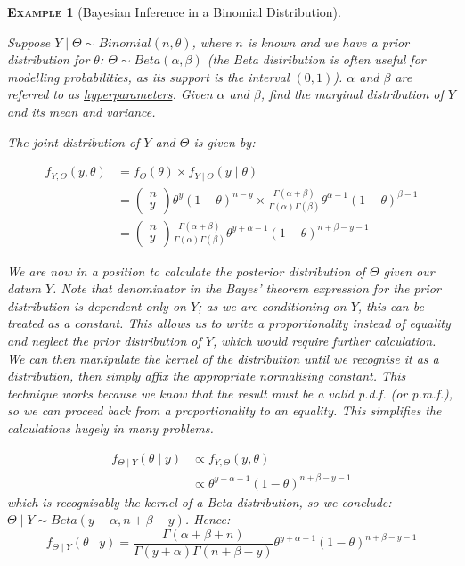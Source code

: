 \documentclass[12pt,a4paper]{article}
\newtheorem{example}{\textsc{Example}}[section]
\begin{document}
\begin{example}[Bayesian Inference in a Binomial Distribution]$\;$\par\vspace{1cm}

Suppose $Y\mid\Theta \sim Binomial(n,\theta)$, where $n$ is known and we have a prior distribution for $\theta$: $\Theta \sim Beta(\alpha,\beta)$ (the Beta distribution is often useful for modelling probabilities, as its support is the interval $(0,1)$). $\alpha$ and $\beta$ are referred to as \underline{hyperparameters}. Given $\alpha$ and $\beta$, find the marginal distribution of $Y$ and its mean and variance.

The joint distribution of $Y$ and $\Theta$ is given by:

\begin{align*}
f_{Y,\Theta}(y,\theta) &= f_\Theta(\theta) \times f_{Y\mid\Theta}(y\mid\theta)\\
&= \left(\begin{array}{c} \!\!n\!\! \\ \!\!y\!\!\end{array}\right)\theta^y (1-\theta)^{n-y} \times \frac{\Gamma(\alpha + \beta)}{\Gamma(\alpha)\Gamma(\beta)}\theta^{\alpha-1} (1-\theta)^{\beta -1}\\
&= \left(\begin{array}{c}\!\!n\!\! \\ \!\!y\!\!\end{array}\right) \frac{\Gamma(\alpha + \beta)}{\Gamma(\alpha)\Gamma(\beta)} \theta^{y+\alpha-1} (1-\theta)^{n+\beta - y -1}
\end{align*}

We are now in a position to calculate the posterior distribution of $\Theta$ given our datum $Y$. Note that denominator in the Bayes' theorem expression for the prior distribution is dependent only on $Y$; as we are conditioning on $Y$, this can be treated as a constant. This allows us to write a proportionality instead of equality and neglect the prior distribution of $Y$, which would require further calculation. We can then manipulate the kernel of the distribution until we recognise it as a distribution, then simply affix the appropriate normalising constant. This technique works because we know that the result must be a valid p.d.f. (or p.m.f.), so we can proceed back from a proportionality to an equality. This simplifies the calculations hugely in many problems.

\begin{align*}
f_{\Theta\mid Y}(\theta\mid y) &\propto f_{Y,\Theta}(y,\theta)\\
&\propto \theta^{y+\alpha-1} (1-\theta)^{n+\beta-y-1}
\end{align*}
which is recognisably the kernel of a Beta distribution, so we conclude: $\Theta\mid Y \sim Beta(y+\alpha,n+\beta-y)$. Hence:
$$f_{\Theta\mid Y}(\theta\mid y) = \frac{\Gamma(\alpha+\beta+n)}{\Gamma(y+\alpha)\Gamma(n+\beta -y)} \theta^{y+\alpha-1} (1-\theta)^{n+\beta-y-1}$$


\end{example}
\end{document}
